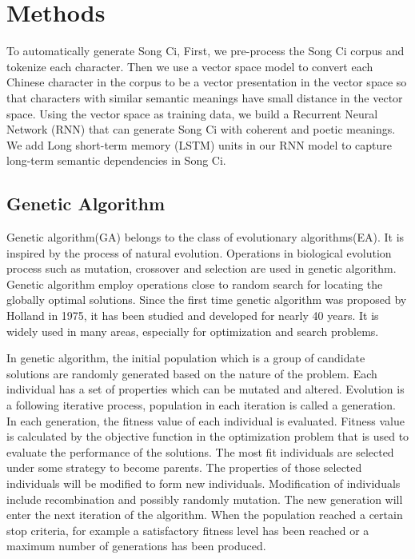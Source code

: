 \section{Methods}
To automatically generate Song Ci,
First, we pre-process the Song Ci corpus and tokenize each character.
%
Then we use a vector space model to convert each Chinese character in the corpus to be a vector presentation in the vector space so that characters with similar semantic meanings have small distance in the vector space.
%
Using the vector space as training data, we build a Recurrent Neural Network (RNN) that can generate Song Ci with coherent and poetic meanings.
%
We add Long short-term memory (LSTM) units in our RNN model to capture long-term semantic dependencies in Song Ci.
\subsection{Genetic Algorithm}
Genetic algorithm(GA) belongs to the class of evolutionary algorithms(EA).
%
It is inspired by the process of natural evolution. Operations in biological evolution process such as mutation, crossover and selection are used in genetic algorithm\cite{banzhaf1998genetic}.
%
Genetic algorithm employ operations close to random search for locating the globally optimal solutions.
%
Since the first time genetic algorithm was proposed by Holland\cite{holland1975adaptation} in 1975, it has been studied and developed for nearly 40 years.
%
It is widely used in many areas, especially for optimization and search problems.


In genetic algorithm, the initial population which is a group of candidate solutions are randomly generated based on the nature of the problem.
%
Each individual has a set of properties which can be mutated and altered.
%
Evolution is a following iterative process, population in each iteration is called a generation.
%
In each generation, the fitness value of each individual is evaluated.
%
Fitness value is calculated by the objective function in the optimization problem that is used to evaluate the performance of the solutions.
%
The most fit individuals are selected under some strategy to become parents. The properties of those selected individuals will be modified to form new individuals.
%
Modification of individuals include recombination and possibly randomly mutation.
%
The new generation will enter the next iteration of the algorithm.
%
When the population reached a certain stop criteria, for example a satisfactory fitness level has been reached or a maximum number of generations has been produced.


